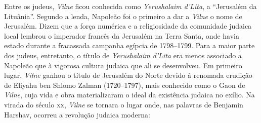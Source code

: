 %

Entre os judeus, \textit{Vilne} ficou conhecida como \textit{Yerushalaim
d'Lita}, a ``Jerusalém da Lituânia''. Segundo a lenda, Napoleão foi o
primeiro a dar a \textit{Vilne} o nome de Jerusalém. Dizem que a força numérica e
a religiosidade da comunidade judaica local lembrou o imperador francês
da Jerusalém na Terra Santa, onde havia estado durante a fracassada
campanha egípcia de 1798--1799. Para a maior parte dos judeus,
entretanto, o título de \textit{Yerushalaim d'Lita} era menos associado a
Napoleão que à vigorosa cultura judaica que ali se desenvolveu. Em
primeiro lugar, \textit{Vilne} ganhou o título de Jerusalém do Norte devido à
renomada erudição de Eliyahu ben Shlomo Zalman (1720--1797), mais
conhecido como o Gaon de \textit{Vilne}, cuja vida e obra materializaram o ideal
da existência judaica no exílio. Na virada do século \textsc{xx}, \textit{Vilne} se
tornara o lugar onde, nas palavras de Benjamin Harshav, ocorreu a
revolução judaica moderna:

